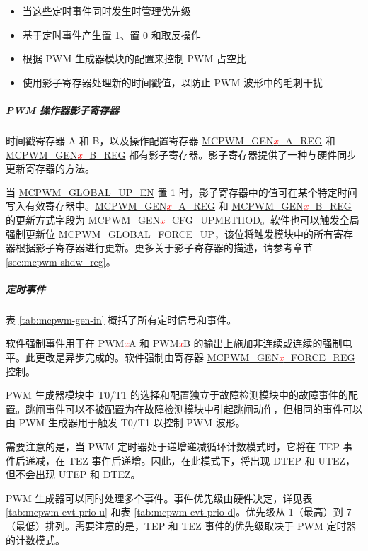 \documentclass[main\_\_CN.tex]{subfiles}
\begin{document}
\begin{itemize}
\begin{itemize}
    \end{itemize}
    \item 当这些定时事件同时发生时管理优先级
    \item 基于定时事件产生置 1、置 0 和取反操作
    \item 根据 PWM 生成器模块的配置来控制 PWM 占空比
    \item 使用影子寄存器处理新的时间戳值，以防止 PWM 波形中的毛刺干扰
\end{itemize}

\subparagraph{PWM 操作器影子寄存器}
时间戳寄存器 A 和 B，以及操作配置寄存器 \hyperref[regdesc:MCPWMGEN0AREG]{MCPWM\_GEN\textcolor{red}{\it{x}}\_A\_REG} 和 \hyperref[regdesc:MCPWMGEN0BREG]{MCPWM\_GEN\textcolor{red}{\it{x}}\_B\_REG} 都有影子寄存器。影子寄存器提供了一种与硬件同步更新寄存器的方法。

当 \hyperref[fielddesc:MCPWMGLOBALUPEN]{MCPWM\_GLOBAL\_UP\_EN} 置 1 时，影子寄存器中的值可在某个特定时间写入有效寄存器中。\hyperref[regdesc:MCPWMGEN0AREG]{MCPWM\_GEN\textcolor{red}{\it{x}}\_A\_REG} 和 \hyperref[regdesc:MCPWMGEN0BREG]{MCPWM\_GEN\textcolor{red}{\it{x}}\_B\_REG} 的更新方式字段为 \hyperref[fielddesc:MCPWMGEN0CFGUPMETHOD]{MCPWM\_GEN\textcolor{red}{\it{x}}\_CFG\_UPMETHOD}。软件也可以触发全局强制更新位 \hyperref[fielddesc:MCPWMGLOBALFORCEUP]{MCPWM\_GLOBAL\_FORCE\_UP}，该位将触发模块中的所有寄存器根据影子寄存器进行更新。更多关于影子寄存器的描述，请参考章节 \ref{sec:mcpwm-shdw_reg}。

\subparagraph{定时事件}
表 \ref{tab:mcpwm-gen-in} 概括了所有定时信号和事件。


 
软件强制事件用于在 PWM\textcolor{red}{\it{x}}A 和 PWM\textcolor{red}{\it{x}}B 的输出上施加非连续或连续的强制电平。此更改是异步完成的。软件强制由寄存器 \hyperref[regdesc:MCPWMGEN0FORCEREG]{MCPWM\_GEN\textcolor{red}{\it{x}}\_FORCE\_REG} 控制。

PWM 生成器模块中 T0/T1 的选择和配置独立于故障检测模块中的故障事件的配置。跳闸事件可以不被配置为在故障检测模块中引起跳闸动作，但相同的事件可以由 PWM 生成器用于触发 T0/T1 以控制 PWM 波形。

需要注意的是，当 PWM 定时器处于递增递减循环计数模式时，它将在 TEP 事件后递减，在 TEZ 事件后递增。因此，在此模式下，将出现 DTEP 和 UTEZ，但不会出现 UTEP 和 DTEZ。

PWM 生成器可以同时处理多个事件。事件优先级由硬件决定，详见表 \ref{tab:mcpwm-evt-prio-u} 和表 \ref{tab:mcpwm-evt-prio-d}。优先级从 1（最高）到 7（最低）排列。需要注意的是，TEP 和 TEZ 事件的优先级取决于 PWM 定时器的计数模式。
\end{document}
